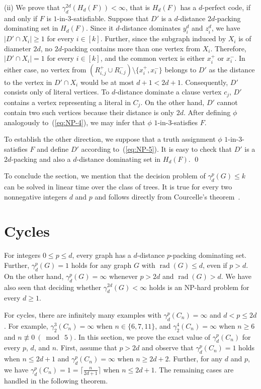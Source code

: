 \documentclass[12pt]{article}
\DeclareMathOperator{\rad}{rad}
\begin{document}
(ii) We prove that $\gamma_d^{2d}(H_d(F)) < \infty$, that is $H_d(F)$ has a $d$-perfect code, if and only if $F$ is $1$-in-$3$-satisfiable. Suppose that $D'$ is a $d$-distance $2d$-packing dominating set in $H_d(F)$. Since it $d$-distance dominates $y_i^d$ and $z_i^d$, we have $|D'\cap X_i| \ge 1$ for every $i \in [k]$. Further, since the subgraph induced by $X_i$ is of diameter $2d$, no $2d$-packing contains more than one vertex from $X_i$. Therefore, $|D'\cap X_i| = 1$ for every $i \in [k]$, and the common vertex is either $x_i^+$ or $x_i^-$. In either case, no vertex from  $(R_{i,j}^+ \cup R_{i,j}^-) \setminus\{x_i^+, x_i^-\}$ belongs to $D'$ as the distance to the vertex in $D' \cap X_i$ would be at most $d+1 <2d+1$. Consequently, $D'$ consists only of literal vertices.
To $d$-distance dominate a clause vertex $c_j$, $D'$ contains a vertex representing a literal in $C_j$. On the other hand, $D'$ cannot contain two such vertices because their distance is only $2d$. After defining $\phi$ analogously to~(\ref{eq:NP-4}), we may infer that $\phi$ $1$-in-$3$-satisfies $F$.

To establish the other direction, we suppose that a truth assignment $\phi$ $1$-in-$3$-satisfies $F$ and define $D'$ according to~(\ref{eq:NP-5}). It is easy to check that $D'$ is a $2d$-packing
 and also a $d$-distance dominating set in $H_d(F)$.
 \qed
 \medskip

 To conclude the section, we mention that the decision problem of $\gamma_d^{p}(G) \leq k$ can be solved in linear time over the class of trees. It is true for every two nonnegative integers $d$ and $p$ and follows directly from Courcelle's theorem~\cite{Courcelle-1990}.

\section{Cycles}
\label{sec:cycles}

For integers $0 \le p \le d$, every graph has a $d$-distance $p$-packing dominating set. Further, $\gamma_d^p(G)=1$ holds for any graph $G$ with $\rad(G)\leq d $, even if $p> d$. On the other hand, $\gamma_d^p(G)=\infty$ whenever $p>2d$ and $\rad(G) > d$. We have also seen that deciding whether $\gamma_d^{2d}(G) < \infty$ holds is an NP-hard problem for every $d \ge 1$.

For cycles, there are infinitely many examples with $\gamma_d^p(C_n)=\infty$ and $d < p \leq 2d$. For example, $\gamma_2^3(C_n)= \infty$ when $n \in \{6,7,11\}$, and $\gamma_2^4(C_n)=\infty$ when $n \ge 6$ and $n \not\equiv 0\ (\bmod\ {5})$. In this section, we prove the exact value of $\gamma_d^p(C_n)$ for every $p$, $d$, and $n$. First, assume that $p>2d$ and observe that $\gamma_d^p(C_n)=1$ holds when $n \le 2 d+1$ and  $\gamma_d^p(C_n)=\infty$ when $n \ge 2d+2$. Further, for any $d$ and $p$, we have $\gamma_d^p(C_n)= 1 = \lceil\frac{n}{2d+1} \rceil$ when $n \leq 2d+1$. The remaining cases are handled in the following theorem.
\end{document}
